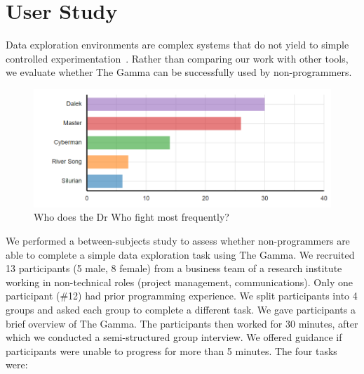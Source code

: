 \documentclass[conference]{IEEEtran}
\begin{document}
\section{User Study}
\label{sec:study}

\noindent
Data exploration environments are complex systems that do not yield to simple controlled
experimentation~\cite{evaluating}. Rather than comparing our work with other tools, we
evaluate whether The Gamma can be successfully used by non-programmers.

\begin{figure}[t]
\centering
\vspace{-0.25em}
\includegraphics[width=0.95\columnwidth]{figures/cases-dr}
\vspace{-0.5em}
\caption{Who does the Dr Who fight most frequently?}
\label{fig:cases-dr}
\vspace{-1em}
\end{figure}


We performed a between-subjects study to assess whether non-programmers are able to complete a
simple data exploration task using The Gamma. We recruited 13 participants (5 male, 8 female)
from a business team of a research institute working in non-technical roles (project management,
communications). Only one participant (\#12) had prior programming experience.
%
We split participants into 4 groups and asked each group to complete a different task.
We gave participants a brief overview of The Gamma. The participants then worked for 30
minutes, after which we conducted a semi-structured group interview. We offered guidance
if participants were unable to progress for more than 5 minutes. The four tasks were:
\end{document}
